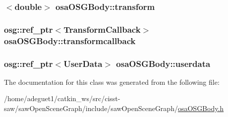 \hypertarget{classosa_o_s_g_body_a587be8e221a906f5c8d9676fadea5caf}{
\subsubsection[{transform}]{$<$double$>$ osa\-O\-S\-G\-Body\-::transform\hspace{0.3cm}{\ttfamily [protected]}}}\label{classosa_o_s_g_body_a587be8e221a906f5c8d9676fadea5caf}
\hypertarget{classosa_o_s_g_body_a8d4d3d23660fa1fbd6cdfec7e2541a14}{
\subsubsection[{transformcallback}]{\setlength{\rightskip}{0pt plus 5cm}osg\-::ref\-\_\-ptr$<${\bf Transform\-Callback}$>$ osa\-O\-S\-G\-Body\-::transformcallback\hspace{0.3cm}{\ttfamily [protected]}}}\label{classosa_o_s_g_body_a8d4d3d23660fa1fbd6cdfec7e2541a14}
\hypertarget{classosa_o_s_g_body_aaaa048aa92048243a7bf355e6d178ec1}{
\subsubsection[{userdata}]{\setlength{\rightskip}{0pt plus 5cm}osg\-::ref\-\_\-ptr$<${\bf User\-Data}$>$ osa\-O\-S\-G\-Body\-::userdata\hspace{0.3cm}{\ttfamily [protected]}}}\label{classosa_o_s_g_body_aaaa048aa92048243a7bf355e6d178ec1}


The documentation for this class was generated from the following file\-:\begin{DoxyCompactItemize}
\item 
/home/adeguet1/catkin\-\_\-ws/src/cisst-\/saw/saw\-Open\-Scene\-Graph/include/saw\-Open\-Scene\-Graph/\hyperlink{osa_o_s_g_body_8h}{osa\-O\-S\-G\-Body.\-h}\end{DoxyCompactItemize}
